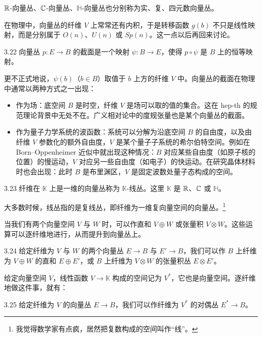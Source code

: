 $\mathbb{R}$-向量丛、$\mathbb{C}$-向量丛、$\mathbb{H}$-向量丛也分别称为实、复、四元数向量丛。

在物理中，向量丛的纤维 $V$ 上常常还有内积，于是转移函数 $g(b)$ 不只是线性映射，而是分别属于 $O(n)$、$U(n)$ 或 $Sp(n)$。这一点以后再回来讨论。

\begin{definition}{3.22}
向量丛 $p:E\to B$ 的截面是一个映射 $\psi:B\to E$，使得 $p\circ\psi$ 是 $B$ 上的恒等映射。
\end{definition}

更不正式地说，$\psi(b)$（$b\in B$）取值于 $b$ 上方的纤维 $V$ 中。向量丛的截面在物理中通常以两种方式之一出现：
\begin{itemize}
  \item 作为场：底空间 $B$ 是时空，纤维 $V$ 是场可以取的值的集合。这在 hep-th 的规范理论背景中无处不在。广义相对论中的度规张量也是某个向量丛的截面。
  \item 作为量子力学系统的波函数：系统可以分解为沿底空间 $B$ 的自由度，以及由纤维 $V$ 参数化的额外自由度，$V$ 是某个量子子系统的希尔伯特空间。例如在 Born--Oppenheimer 近似中就出现这种情况：$B$ 对应某些自由度（如原子核的位置）的慢运动，$V$ 对应另一些自由度（如电子）的快运动。在研究晶体材料时也会出现：此时 $B$ 是布里渊区，$V$ 是固定波数处量子态构成的空间。
\end{itemize}

\begin{definition}{3.23}
纤维在 $\mathbb{K}$ 上是一维的向量丛称为 $\mathbb{K}$-线丛。这里 $\mathbb{K}$ 是 $\mathbb{R}$、$\mathbb{C}$ 或 $\mathbb{H}$。
\end{definition}

大多数时候，线丛指的是复线丛，即纤维为一维复向量空间的向量丛。\footnote{我觉得数学家有点疯，居然把复数构成的空间叫作“线”。}

当我们有两个向量空间 $V$ 与 $W$ 时，可以作直和 $V\oplus W$ 或张量积 $V\otimes W$。这些运算可以逐纤维地进行，从而提升到向量丛上。

\begin{definition}{3.24}
给定纤维为 $V$ 与 $W$ 的两个向量丛 $E\to B$ 与 $E'\to B$，我们可以作 $B$ 上纤维为 $V\oplus W$ 的直和 $E\oplus E'$，或 $B$ 上纤维为 $V\otimes W$ 的张量积丛 $E\otimes E'$。
\end{definition}

给定向量空间 $V$，线性函数 $V\to\mathbb{K}$ 构成的空间记为 $V^*$，它也是向量空间。逐纤维地做这件事，就有：

\begin{definition}{3.25}
给定纤维为 $V$ 的向量丛 $E\to B$，我们可以作纤维为 $V^*$ 的对偶丛 $E^*\to B$。
\end{definition}

